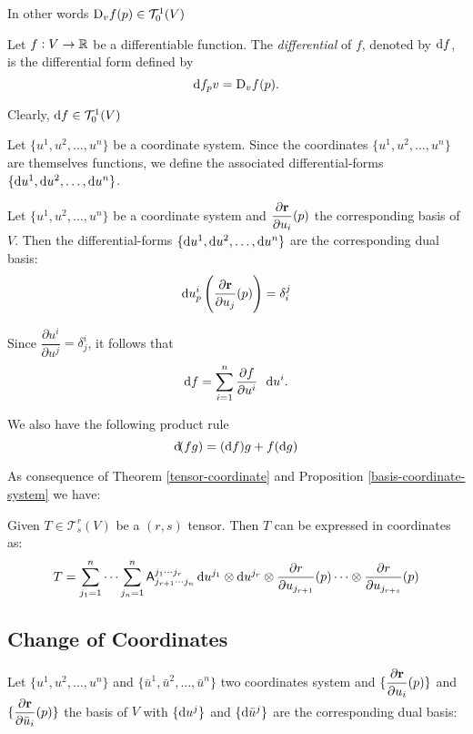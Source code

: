  In other words 
${\mathrm{D}}_vf(p)\in \mathcal{T}_{0}^1(V)$

\begin{df}
 Let  $f:V\to \mathbb{R}$  be a differentiable function. The  \emph{differential} of $f$, denoted by  $\d f$,
is the differential form defined by 
\[\d f_p v= \D_vf(p) .  \]

Clearly, $\d f \in \mathcal{T}_{0}^1(V) $
\end{df}


Let $\{u^1, u^2, \dots, u^n\}$ be a coordinate system. Since the coordinates $\{u^1, u^2, \dots, u^n\}$ are themselves functions, we define the associated  differential-forms $\{\d u^1, \d u^2, \dots, \d u^n\}$.


\begin{proposition} \label{basis-coordinate-system}
Let $\{u^1, u^2, \dots, u^n\}$ be a coordinate system and $\dfrac{\partial \mathbf{ r}}{\partial u_i}(p)$ the corresponding basis of $V$.
Then the differential-forms $\{\d u^1, \d u^2, \dots, \d u^n\}$ are the corresponding dual basis:
\[\d u^i_p\left( \dfrac{\partial \vector{r}}{\partial u_j}(p)\right)=\delta_i^j\]
\end{proposition}


Since $\dfrac{\partial u^i}{\partial u^j}=\delta^i_j$, it follows that
\[\d f = \sum_{i=1}^n \dfrac{\partial f}{\partial u^i} \, \du^i .\]

We also have the following product rule
\[ \d (fg)= (\d f) g +f (\d g) \]

As consequence of Theorem \ref{tensor-coordinate} and Proposition  \ref{basis-coordinate-system} we have:

\begin{theorem} \label{tensor-coordinate}
 Given $T \in \mathcal{T}^r_s(V)$
be   a $(r,s)$ tensor. Then $T$ can be expressed in coordinates as:
\[T=\dsum_{j_1=1}^{n} \cdots \dsum_{j_n=1}^{n}  \tsor{A}^{j_1\cdots j_r} _{j_{r+1}\cdots j_n} \d u^{j_1}\otimes \d u^{j_r} \otimes  \dfrac{\partial r}{\partial u_{j_{r+1}}}(p) \cdots \otimes  \dfrac{\partial r}{\partial u_{j_{r+s}}}(p)
\]
\end{theorem}




\subsection{Change of Coordinates}

Let $\{u^1, u^2, \dots, u^n\}$ and $\{\bar{u}^1, \bar{u}^2, \dots, \bar{u}^n\}$  two coordinates system and $\{\dfrac{\partial \mathbf{ r}}{\partial u_i}(p)\}$ and $\{\dfrac{\partial \mathbf{ r}}{\partial \bar{u}_i}(p)\}$ the  basis of $V$ with 
$\{\d u^j\}$ and $\{\d \bar{u}^j\}$ are the corresponding dual basis:


